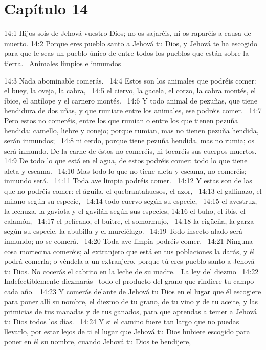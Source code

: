 \section*{Capítulo 14 }

14:1 Hijos sois de Jehová vuestro Dios; no os sajaréis, ni os raparéis a causa de muerto. 
14:2 Porque eres pueblo santo a Jehová tu Dios, y Jehová te ha escogido para que le seas un pueblo único de entre todos los pueblos que están sobre la tierra.  
Animales limpios e inmundos  

14:3 Nada abominable comerás.  
14:4 Estos son los animales que podréis comer: el buey, la oveja, la cabra,  
14:5 el ciervo, la gacela, el corzo, la cabra montés, el íbice, el antílope y el carnero montés.  
14:6 Y todo animal de pezuñas, que tiene hendidura de dos uñas, y que rumiare entre los animales, ese podréis comer.  
14:7 Pero estos no comeréis, entre los que rumian o entre los que tienen pezuña hendida: camello, liebre y conejo; porque rumian, mas no tienen pezuña hendida, serán inmundos;  
14:8 ni cerdo, porque tiene pezuña hendida, mas no rumia; os será inmundo. De la carne de éstos no comeréis, ni tocaréis sus cuerpos muertos.  
14:9 De todo lo que está en el agua, de estos podréis comer: todo lo que tiene aleta y escama.  
14:10 Mas todo lo que no tiene aleta y escama, no comeréis; inmundo será.  
14:11 Toda ave limpia podréis comer.  
14:12 Y estas son de las que no podréis comer: el águila, el quebrantahuesos, el azor,  
14:13 el gallinazo, el milano según su especie,  
14:14 todo cuervo según su especie,  
14:15 el avestruz, la lechuza, la gaviota y el gavilán según sus especies, 
14:16 el buho, el ibis, el calamón,  
14:17 el pelícano, el buitre, el somormujo,  
14:18 la cigüeña, la garza según su especie, la abubilla y el murciélago.  
14:19 Todo insecto alado será inmundo; no se comerá.  
14:20 Toda ave limpia podréis comer.  
14:21 Ninguna cosa mortecina comeréis; al extranjero que está en tus poblaciones la darás, y él podrá comerla; o véndela a un extranjero, porque tú eres pueblo santo a Jehová tu Dios. No cocerás el cabrito en la leche de su madre.  
La ley del diezmo  
14:22 Indefectiblemente diezmarás  todo el producto del grano que rindiere tu campo cada año.  
14:23 Y comerás delante de Jehová tu Dios en el lugar que él escogiere para poner allí su nombre, el diezmo de tu grano, de tu vino y de tu aceite, y las primicias de tus manadas y de tus ganados, para que aprendas a temer a Jehová tu Dios todos los días.  
14:24 Y si el camino fuere tan largo que no puedas llevarlo, por estar lejos de ti el lugar que Jehová tu Dios hubiere escogido para poner en él su nombre, cuando Jehová tu Dios te bendijere,  
